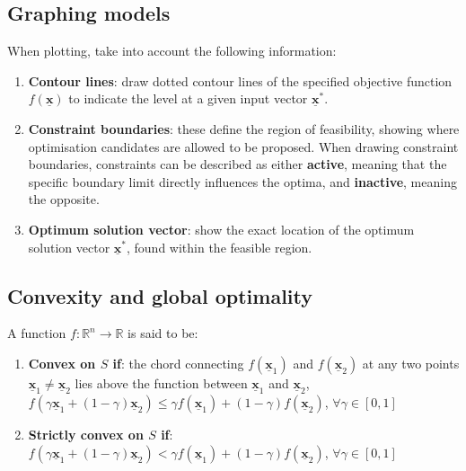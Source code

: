 \documentclass{article}
\begin{document}
\subsection{Graphing models}

When plotting, take into account the following information: 

\begin{enumerate}
    \item \textbf{Contour lines}: draw dotted contour lines of the specified objective function \(f\left(\underline{\textbf{x}}\right)\) to indicate the level at a given input vector \(\underline{\textbf{x}}^*\).
    \item \textbf{Constraint boundaries}: these define the region of feasibility, showing where optimisation candidates are allowed to be proposed. When drawing constraint boundaries, constraints can be described as either \textbf{active}, meaning that the specific boundary limit directly influences the optima, and \textbf{inactive}, meaning the opposite.
    \item \textbf{Optimum solution vector}: show the exact location of the optimum solution vector \(\underline{\textbf{x}}^*\), found within the feasible region.
\end{enumerate}



\subsection{Convexity and global optimality}

A function \(f: \mathbb{R}^n \xrightarrow{} \mathbb{R}\) is said to be:
\begin{enumerate}
    \item \textbf{Convex on \(S\) if}: the chord connecting \(f\left(\underline{\textbf{x}}_1\right)\) and \(f\left(\underline{\textbf{x}}_2\right)\) at any two points \(\underline{\textbf{x}}_1 \ne \underline{\textbf{x}}_2\) lies above the function between \(\underline{\textbf{x}}_1\) and \(\underline{\textbf{x}}_2\),
    \(f\left( \gamma \underline{\textbf{x}}_1 + \left( 1 - \gamma\right) \underline{\textbf{x}}_2\right) \leq \gamma f\left(\underline{\textbf{x}}_1\right) +\left(1-\gamma\right)f\left(\underline{\textbf{x}}_2\right)\), \(\forall \gamma \in \left[ 0, 1\right]\)
    \item \textbf{Strictly convex on \(S\) if}:
    \(f\left( \gamma \underline{\textbf{x}}_1 + \left( 1 - \gamma\right) \underline{\textbf{x}}_2\right) < \gamma f\left(\underline{\textbf{x}}_1\right) +\left(1-\gamma\right)f\left(\underline{\textbf{x}}_2\right)\), \(\forall \gamma \in \left[ 0, 1\right]\)
\end{enumerate}
\end{document}
